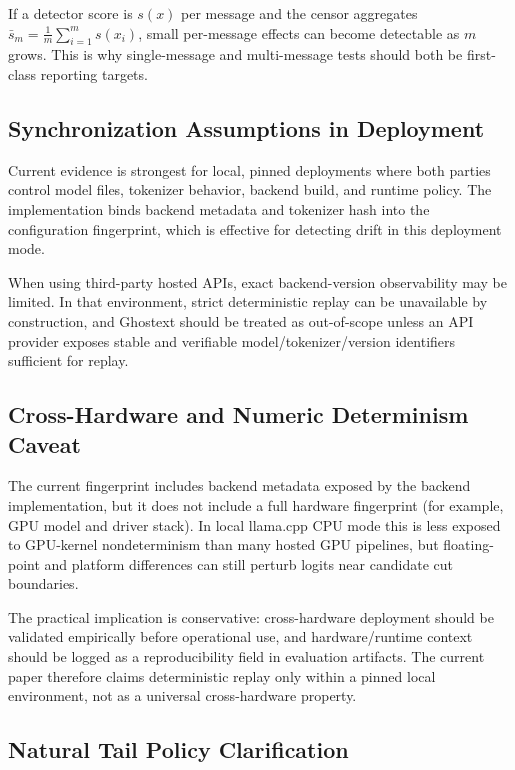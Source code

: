 If a detector score is $s(x)$ per message and the censor aggregates
$\bar{s}_m = \frac{1}{m}\sum_{i=1}^{m}s(x_i)$,
small per-message effects can become detectable as $m$ grows.
This is why single-message and multi-message tests should both be first-class reporting targets.

\subsection{Synchronization Assumptions in Deployment}

Current evidence is strongest for local, pinned deployments where both parties control model files, tokenizer behavior, backend build, and runtime policy. The implementation binds backend metadata and tokenizer hash into the configuration fingerprint, which is effective for detecting drift in this deployment mode.

When using third-party hosted APIs, exact backend-version observability may be limited. In that environment, strict deterministic replay can be unavailable by construction, and Ghostext should be treated as out-of-scope unless an API provider exposes stable and verifiable model/tokenizer/version identifiers sufficient for replay.

\subsection{Cross-Hardware and Numeric Determinism Caveat}

The current fingerprint includes backend metadata exposed by the backend implementation, but it does not include a full hardware fingerprint (for example, GPU model and driver stack). In local llama.cpp CPU mode this is less exposed to GPU-kernel nondeterminism than many hosted GPU pipelines, but floating-point and platform differences can still perturb logits near candidate cut boundaries.

The practical implication is conservative: cross-hardware deployment should be validated empirically before operational use, and hardware/runtime context should be logged as a reproducibility field in evaluation artifacts. The current paper therefore claims deterministic replay only within a pinned local environment, not as a universal cross-hardware property.

\subsection{Natural Tail Policy Clarification}

